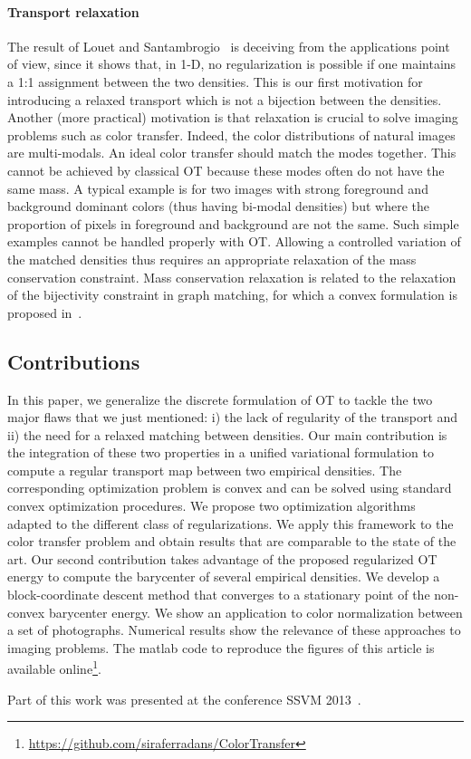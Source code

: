 \paragraph{Transport relaxation}

The result of Louet and Santambrogio~\cite{louet-regularizaton-1d} is deceiving from the applications point of view, since it shows that, in 1-D, no regularization is possible if one  maintains a 1:1 assignment between the two densities. This is our first motivation for introducing a relaxed transport which is not a bijection between the densities.  Another (more practical) motivation is that relaxation is crucial to solve imaging problems such as color transfer. Indeed, the color distributions of natural images are multi-modals. An ideal color transfer should match the modes together. This cannot be achieved by classical OT because these modes often do not have the same mass. A typical example is for two images with strong foreground and background dominant colors (thus having bi-modal densities) but where the proportion of pixels in foreground and background are not the same. Such simple examples cannot be handled properly with OT. Allowing a controlled variation of the matched densities thus requires an appropriate relaxation of the mass conservation constraint. Mass conservation relaxation is related to the relaxation of the bijectivity constraint in graph matching, for which a convex formulation is proposed in~\cite{Zaslavskiy-graph-match}. 



\subsection{Contributions}

In this paper, we generalize the discrete formulation of OT to tackle the two major flaws that we just mentioned: i) the lack of regularity of the transport and ii) the need for a relaxed matching between densities. Our main contribution is the integration of these two properties in a unified variational formulation to compute a regular transport map between two empirical densities. The corresponding optimization problem is convex and can be solved using standard convex optimization procedures. We propose two optimization algorithms adapted to the different class of regularizations. We apply this framework to the color transfer problem and obtain results that are comparable to the state of the art. 
Our second contribution takes advantage of the proposed regularized OT energy to compute the barycenter of several empirical densities. 
We develop a block-coordinate descent method that converges to a stationary point of the non-convex barycenter energy. We show an application
 to color normalization between a set of photographs. Numerical results show the relevance of these approaches to imaging problems. The matlab code to reproduce the figures of this article is available online\footnote{\url{https://github.com/siraferradans/ColorTransfer}}.

Part of this work was presented at the conference SSVM 2013~\cite{2013-ssvm-regul-ot}. 


